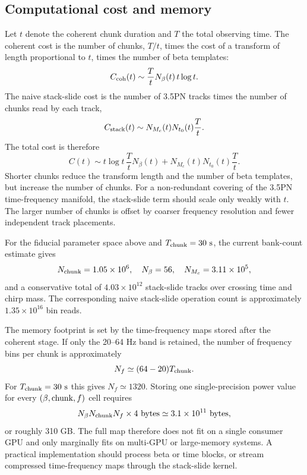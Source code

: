 \documentclass[aps,prd,amsmath,floats,floatfix, twocolumn,
superscriptaddress,nofootinbib,showpacs]{revtex4-2}
\begin{document}
\subsection{Computational cost and memory}
\label{sec:method_cost}
Let $t$ denote the coherent chunk duration and $T$ the total observing time.
The coherent cost is the number of chunks, $T/t$, times the cost of a transform
of length proportional to $t$, times the number of beta templates:
\begin{equation}
C_{\rm coh}(t)
\sim
\frac{T}{t}N_\beta(t)\,t\log t .
\end{equation}
The naive stack-slide cost is the number of 3.5PN tracks times the number of
chunks read by each track,
\begin{equation}
C_{\rm stack}(t)
\sim
N_{M_c}(t)N_{t_0}(t)\frac{T}{t}.
\end{equation}
The total cost is therefore
\begin{equation}
C(t)
\sim
t\log t\,\frac{T}{t}N_\beta(t)
+
N_{M_c}(t)N_{t_0}(t)\frac{T}{t}.
\label{eq:method_cost}
\end{equation}
Shorter chunks reduce the transform length and the number of beta templates,
but increase the number of chunks.  For a non-redundant covering of the
3.5PN time-frequency manifold, the stack-slide term should scale only weakly
with $t$.  The larger number of chunks is offset by coarser frequency
resolution and fewer independent track placements.

For the fiducial parameter space above and $T_{\rm chunk}=30~{\rm s}$, the
current bank-count estimate gives
\begin{equation}
N_{\rm chunk}=1.05\times10^6,\quad
N_\beta=56,\quad
N_{M_c}=3.11\times10^5,
\end{equation}
and a conservative total of $4.03\times10^{12}$ stack-slide tracks over
crossing time and chirp mass.  The corresponding naive stack-slide operation
count is approximately $1.35\times10^{16}$ bin reads.

The memory footprint is set by the time-frequency maps stored after the
coherent stage.  If only the 20--64 Hz band is retained, the number of
frequency bins per chunk is approximately
\begin{equation}
N_f \simeq (64-20)T_{\rm chunk}.
\end{equation}
For $T_{\rm chunk}=30~{\rm s}$ this gives $N_f\simeq1320$.  Storing one
single-precision power value for every $(\beta,{\rm chunk},f)$ cell requires
\begin{equation}
N_\beta N_{\rm chunk}N_f \times 4~{\rm bytes}
\simeq
3.1\times10^{11}~{\rm bytes},
\end{equation}
or roughly 310 GB.  The full map therefore does not fit on a single consumer
GPU and only marginally fits on multi-GPU or large-memory systems.  A practical
implementation should process beta or time blocks, or stream compressed
time-frequency maps through the stack-slide kernel.
\end{document}
